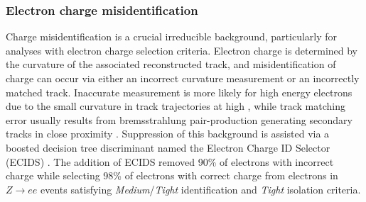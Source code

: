 \documentclass[../thesis.tex]{subfiles}
\begin{document}
\subsubsection*{Electron charge misidentification}
Charge misidentification is a crucial irreducible background, particularly for analyses with electron charge selection criteria. Electron charge is determined by the curvature of the associated reconstructed track, and misidentification of charge can occur via either an incorrect curvature measurement or an incorrectly matched track. Inaccurate measurement is more likely for high energy electrons due to the small curvature in track trajectories at high \pT, while track matching error usually results from bremsstrahlung pair-production generating secondary tracks in close proximity \citep{reco:electron_id}. Suppression of this background is assisted via a boosted decision tree discriminant named the Electron Charge ID Selector (\acs{ECIDS}) \citep{reco:qmisid_cnn}. The addition of \acs{ECIDS} removed 90\% of electrons with incorrect charge while selecting 98\% of electrons with correct charge from electrons in $Z\rightarrow ee$ events satisfying \textit{Medium}/\textit{Tight} identification and \textit{Tight} isolation criteria.
\end{document}
